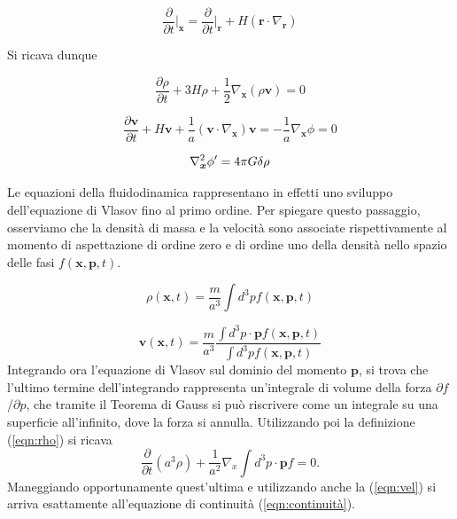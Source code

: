 \begin{equation}
    \frac{\partial}{\partial t}\biggr|_{\bm{x}} = \frac{\partial}{\partial t}\biggr|_{\bm{r}} + H(\bm{r} \cdot \nabla_{\bm{r}})
\end{equation}

Si ricava dunque

\begin{equation}
    \label{eqn:continuitax}
    \frac{\partial\rho}{\partial t} + 3H\rho +\frac{1}{2}\nabla_{\bm{x}}(\rho\bm{v}) = 0
\end{equation}

\begin{equation}
    \label{eqn:eulerox}
    \frac{\partial \bm{v}}{\partial t} + H \bm{v} + \frac{1}{a}(\bm{v}\cdot\nabla_{\bm{x}})\bm{v} = -\frac{1}{a}\nabla_{\bm{x}}\phi = 0
\end{equation}

\begin{equation}
    \label{eqn:poissonx}
    \laplacian_{\bm{x}}\phi{'} = 4\pi G \delta\rho
\end{equation}

Le equazioni della fluidodinamica rappresentano in effetti uno sviluppo dell'equazione 
di Vlasov fino al primo ordine. Per spiegare questo passaggio, osserviamo che la densità
di massa e la velocità sono associate rispettivamente al momento di aspettazione di ordine 
zero e di ordine uno della densità nello spazio delle fasi $f(\bm{x}, \bm{p}, t)$.

\begin{equation}
    \label{eqn:rho}
    \rho(\bm{x}, t) = \frac{m}{a^3}\int d^3p f(\bm{x}, \bm{p}, t)
\end{equation}

\begin{equation}
    \label{eqn:vel}
    \bm{v}(\bm{x}, t) = \frac{m}{a^3}\frac{\int d^3p \cdot \bm{p}f(\bm{x}, \bm{p}, t)}{\int d^3p f(\bm{x}, \bm{p}, t)}
\end{equation}
Integrando ora l'equazione di Vlasov sul dominio del momento $\bm{p}$, si trova che l'ultimo termine
dell'integrando rappresenta un'integrale di volume della forza $\partial f$/$\partial p$, che tramite
il Teorema di Gauss si può riscrivere come un integrale su una superficie all'infinito, dove la forza
si annulla. Utilizzando poi la definizione (\ref{eqn:rho}) si ricava 
\begin{equation}
    \frac{\partial}{\partial t}(a^3 \rho) + \frac{1}{a^2}\nabla_x \int d^3 p \cdot \bm{p} f = 0.
\end{equation}
Maneggiando opportunamente quest'ultima e utilizzando anche la (\ref{eqn:vel})
si arriva esattamente all'equazione di continuità (\ref{eqn:continuità}).


